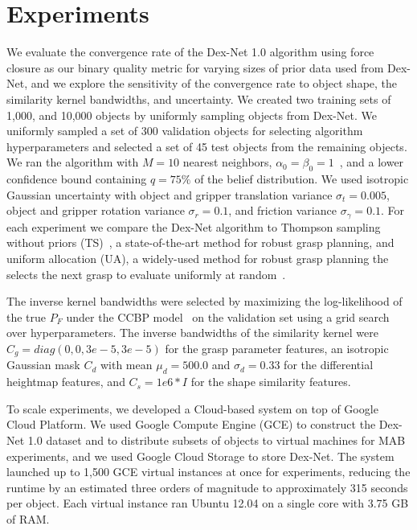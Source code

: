 \section{Experiments}

We evaluate the convergence rate of the Dex-Net 1.0 algorithm using force closure as our binary quality metric for varying sizes of prior data used from Dex-Net, and we explore the sensitivity of the convergence rate to object shape, the similarity kernel bandwidths, and uncertainty.
We created two training sets of 1,000, and 10,000 objects by uniformly sampling objects from Dex-Net.
We uniformly sampled a set of 300 validation objects for selecting algorithm hyperparameters and selected a set of 45 test objects from the remaining objects.
We ran the algorithm with $M = 10$ nearest neighbors, $\alpha_0 = \beta_0 = 1$~\cite{laskey2015bandits}, and a lower confidence bound containing $q=75\%$ of the belief distribution.
We used isotropic Gaussian uncertainty with object and gripper translation variance $\sigma_{t} = 0.005$, object and gripper rotation variance $\sigma_{r} = 0.1$, and friction variance $\sigma_{\gamma} = 0.1$.
For each experiment we compare the Dex-Net algorithm to Thompson sampling without priors (TS)~\cite{laskey2015bandits}, a state-of-the-art method for robust grasp planning, and uniform allocation (UA), a widely-used method for robust grasp planning the selects the next grasp to evaluate uniformly at random~\cite{kehoe2012toward, kim2012physically, weisz2012pose}.

The inverse kernel bandwidths were selected by maximizing the log-likelihood of the true $P_F$ under the CCBP model~\cite{goetschalckx2011continuous} on the validation set using a grid search over hyperparameters.
The inverse bandwidths of the similarity kernel were $C_g = diag(0,0,3e-5, 3e-5)$ for the grasp parameter features, an isotropic Gaussian mask $C_d$ with mean $\mu_d = 500.0$ and $\sigma_d = 0.33$ for the differential heightmap features, and $C_s = 1e6 * I$ for the shape similarity features.

To scale experiments, we developed a Cloud-based system on top of Google Cloud Platform.
We used Google Compute Engine (GCE) to construct the Dex-Net 1.0 dataset and to distribute subsets of objects to virtual machines for MAB experiments, and we used Google Cloud Storage to store Dex-Net.
The system launched up to 1,500 GCE virtual instances at once for experiments, reducing the runtime by an estimated three orders of magnitude to approximately 315 seconds per object.
Each virtual instance ran Ubuntu 12.04 on a single core with 3.75 GB of RAM.

